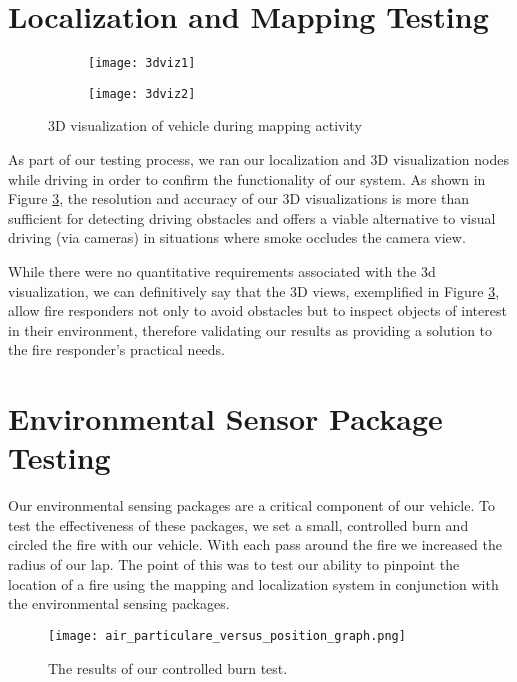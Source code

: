 \section{Localization and Mapping Testing}

\begin{figure}[h!]
	\centering
	\begin{subfigure}{.5\textwidth}
		\centering
		\texttt{[image: 3dviz1]}
		\label{fig:3dviz1}
	\end{subfigure}%
	\begin{subfigure}{.5\textwidth}
		\centering
		\texttt{[image: 3dviz2]}
		\label{fig:3dviz2}
	\end{subfigure}
	\caption{3D visualization of vehicle during mapping activity}
	\label{fig:3dviz}
\end{figure}

As part of our testing process, we ran our localization and 3D visualization nodes while driving in order to confirm the functionality of our system. As shown in Figure \ref{fig:3dviz}, the resolution and accuracy of our 3D visualizations is more than sufficient for detecting driving obstacles and offers a viable alternative to visual driving (via cameras) in situations where smoke occludes the camera view.

While there were no quantitative requirements associated with the 3d visualization, we can definitively say that the 3D views, exemplified in Figure \ref{fig:3dviz}, allow fire responders not only to avoid obstacles but to inspect objects of interest in their environment, therefore validating our results as providing a solution to the fire responder's practical needs.

\section{Environmental Sensor Package Testing}
Our environmental sensing packages are a critical component of our vehicle.  To test the effectiveness of these packages, we set a small, controlled burn and circled the fire with our vehicle.  With each pass around the fire we increased the radius of our lap.  The point of this was to test our ability to pinpoint the location of a fire using the mapping and localization system in conjunction with the environmental sensing packages.

\begin{figure}[h!]
\centerline{\texttt{[image: air\_particulare\_versus\_position\_graph.png]}}
\caption[]{The results of our controlled burn test.}
\label{fig:air_particulate_versus_position_graph}
\end{figure}

